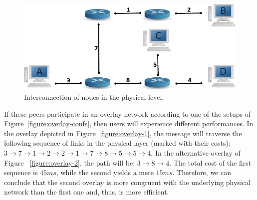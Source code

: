 \begin{figure}
\centering
  \includegraphics[scale=0.8]{img/phys.pdf}
\caption{Interconnection of nodes in the physical level.}
\label{figure:phys}
\end{figure}

If these peers participate in an overlay network according to one of the setups
of Figure~\ref{figure:overlay-confs}, then users will experience different
performances. In the overlay depicted in Figure~\ref{figure:overlay-1}, the
message will traverse the following sequence of links in the physical layer
(marked with their costs): $3 \rightarrow 7 \rightarrow 1 \rightarrow 2
\rightarrow 2 \rightarrow 1 \rightarrow 7 \rightarrow 8 \rightarrow 5
\rightarrow 5 \rightarrow 4$. In the alternative overlay of Figure
~\ref{figure:overlay-2}, the path will be: $3 \rightarrow 8 \rightarrow 4$. The
total cost of the first sequence is $45 ms$, while the second yields a mere $15
ms$. Therefore, we can conclude that the second overlay is more congruent with
the underlying physical network than the first one and, thus, is more efficient.

